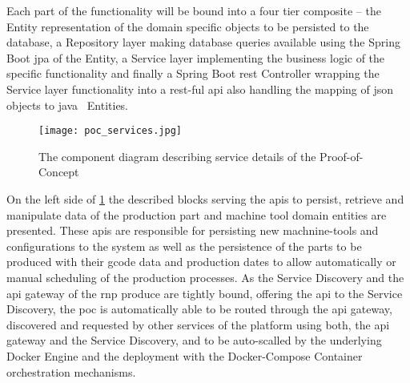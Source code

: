 \documentclass[
a4paper,
twoside,
headsepline,
cleardoublepage=empty,
parskip=half,
draft=false
]{scrbook}
\begin{document}
				Each part of the functionality will be bound into a four tier composite -- the Entity representation of the domain specific objects to be persisted to the database, a Repository layer making database queries available using the Spring Boot \gls{jpa} of the Entity, a Service layer implementing the business logic of the specific functionality and finally a Spring Boot \gls{rest} Controller wrapping the Service layer functionality into a \gls{rest}-ful \gls{api} also handling the mapping of \gls{json} objects to \gls{java}~\cite{java2015} Entities.

				\begin{figure}[H]
					\centering
					\texttt{[image: poc\_services.jpg]}
					\caption{The component diagram describing service details of the Proof-of-Concept}
					\label{fig:poc_service_diagram}
				\end{figure}

				On the left side of \cref{fig:poc_service_diagram} the described blocks serving the \gls{api}s to persist, retrieve and manipulate data of the production part and machine tool domain entities are presented. These \gls{api}s are responsible for persisting new machnine-tools and configurations to the system as well as the persistence of the parts to be produced with their \gls{gcode} data and production dates to allow automatically or manual scheduling of the production processes. As the Service Discovery and the \gls{api} gateway of the \gls{rnp} produce are tightly bound, offering the \gls{api} to the Service Discovery, the \gls{poc} is automatically able to be routed through the \gls{api} gateway, discovered and requested by other services of the platform using both, the \gls{api} gateway and the Service Discovery, and to be auto-scalled by the underlying Docker Engine and the deployment with the Docker-Compose Container orchestration mechanisms.
\end{document}
